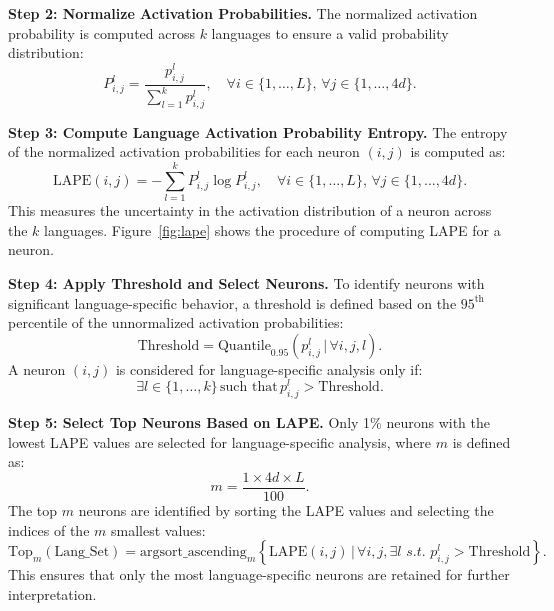 \textbf{Step 2: Normalize Activation Probabilities.} 
The normalized activation probability is computed across $k$ languages to ensure a valid probability distribution:
\begin{equation}
	P_{i,j}^l = \frac{p_{i,j}^l}{\sum_{l=1}^k p_{i,j}^l}, \quad \forall i \in \{1, \dots, L\}, \, \forall j \in \{1, \dots, 4d\}.
\end{equation}

\textbf{Step 3: Compute Language Activation Probability Entropy.} 
The entropy of the normalized activation probabilities for each neuron $(i, j)$ is computed as:
\begin{equation}
	\text{LAPE}(i, j) = - \sum_{l=1}^k P_{i,j}^l \log P_{i,j}^l, \quad \forall i \in \{1, \dots, L\}, \, \forall j \in \{1, \dots, 4d\}.
\end{equation}
This measures the uncertainty in the activation distribution of a neuron across the $k$ languages. Figure~\ref{fig:lape} shows the procedure of computing LAPE for a neuron.

\textbf{Step 4: Apply Threshold and Select Neurons.} 
To identify neurons with significant language-specific behavior, a threshold is defined based on the $95^\text{th}$ percentile of the unnormalized activation probabilities:
\begin{equation}
	\text{Threshold} = \text{Quantile}_{0.95}\left(p_{i,j}^l \, | \, \forall i, j, l\right).
\end{equation}
A neuron $(i, j)$ is considered for language-specific analysis only if:
\begin{equation}
	\exists l \in \{1, \dots, k\} \, \text{such that} \, p_{i,j}^l > \text{Threshold}.
\end{equation}

\textbf{Step 5: Select Top Neurons Based on LAPE.} 
Only 1\% neurons with the lowest LAPE values are selected for language-specific analysis, where $m$ is defined as:
\begin{equation}
	m = \frac{1 \times 4d \times L}{100}.
\end{equation}
The top \(m\) neurons are identified by sorting the LAPE values and selecting the indices of the \(m\) smallest values:
\begin{equation}
	\text{Top}_m(\text{Lang\_Set}) = \text{argsort\_ascending}_m \left\{\text{LAPE}(i,j) \,|\, \forall i, j, \exists l \,\, s.t. \,\,  p_{i,j}^l > \text{Threshold} \right\}.
\end{equation}
This ensures that only the most language-specific neurons are retained for further interpretation. 

